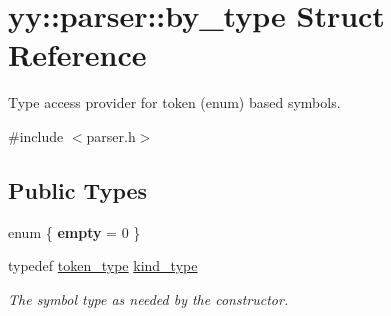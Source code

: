\hypertarget{structyy_1_1parser_1_1by__type}{}\section{yy\+:\+:parser\+:\+:by\+\_\+type Struct Reference}
\label{structyy_1_1parser_1_1by__type}


Type access provider for token (enum) based symbols.  




{\ttfamily \#include $<$parser.\+h$>$}

\subsection*{Public Types}
\begin{DoxyCompactItemize}
\item 
\hypertarget{structyy_1_1parser_1_1by__type_a101f5050061c63717e96210c68df732e}{}enum \{ {\bfseries empty} = 0
 \}\label{structyy_1_1parser_1_1by__type_a101f5050061c63717e96210c68df732e}

\item 
\hypertarget{structyy_1_1parser_1_1by__type_af8757490fd5397ad574e9fee1b80fa25}{}typedef \hyperlink{classyy_1_1parser_ac1ba3f834abfa251ea746c4ca8da5a85}{token\+\_\+type} \hyperlink{structyy_1_1parser_1_1by__type_af8757490fd5397ad574e9fee1b80fa25}{kind\+\_\+type}\label{structyy_1_1parser_1_1by__type_af8757490fd5397ad574e9fee1b80fa25}

\begin{DoxyCompactList}\small\item\em The symbol type as needed by the constructor. \end{DoxyCompactList}\end{DoxyCompactItemize}

